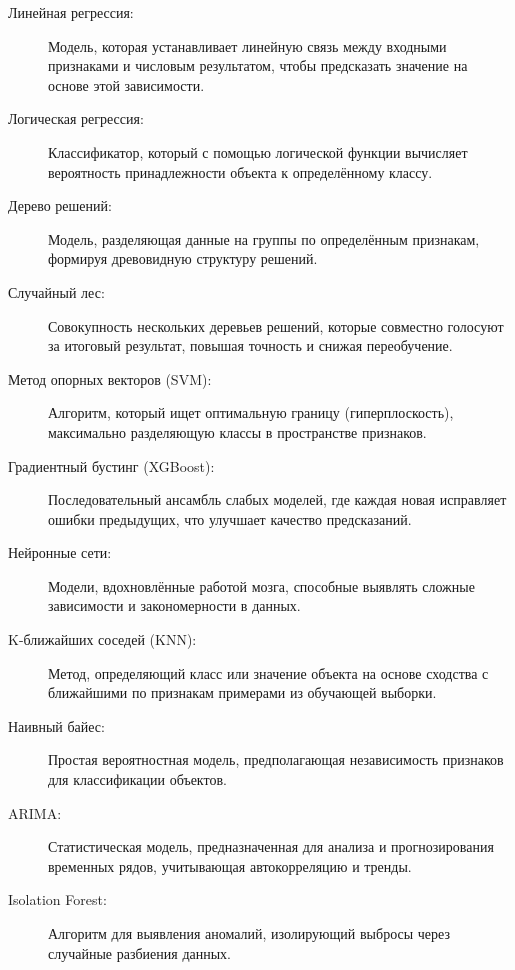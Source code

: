 \documentclass[14pt]{extarticle}
\begin{document}
\begin{description}
    \item[Линейная регрессия:] Модель, которая устанавливает линейную связь между входными признаками и числовым результатом, чтобы предсказать значение на основе этой зависимости.
    
    \item[Логическая регрессия:] Классификатор, который с помощью логической функции вычисляет вероятность принадлежности объекта к определённому классу.
    
    \item[Дерево решений:] Модель, разделяющая данные на группы по определённым признакам, формируя древовидную структуру решений.
    
    \item[Случайный лес:] Совокупность нескольких деревьев решений, которые совместно голосуют за итоговый результат, повышая точность и снижая переобучение.
    
    \item[Метод опорных векторов (SVM):] Алгоритм, который ищет оптимальную границу (гиперплоскость), максимально разделяющую классы в пространстве признаков.
    
    \item[Градиентный бустинг (XGBoost):] Последовательный ансамбль слабых моделей, где каждая новая исправляет ошибки предыдущих, что улучшает качество предсказаний.
    
    \item[Нейронные сети:] Модели, вдохновлённые работой мозга, способные выявлять сложные зависимости и закономерности в данных.
    
    \item[K-ближайших соседей (KNN):] Метод, определяющий класс или значение объекта на основе сходства с ближайшими по признакам примерами из обучающей выборки.
    
    \item[Наивный байес:] Простая вероятностная модель, предполагающая независимость признаков для классификации объектов.
    
    \item[ARIMA:] Статистическая модель, предназначенная для анализа и прогнозирования временных рядов, учитывающая автокорреляцию и тренды.
    
    \item[Isolation Forest:] Алгоритм для выявления аномалий, изолирующий выбросы через случайные разбиения данных.
    

\end{description}
\end{document}
